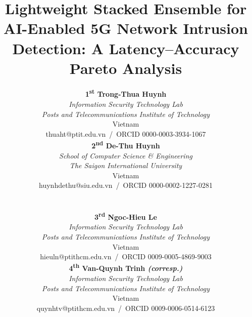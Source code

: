 \documentclass[conference]{IEEEtran}
\begin{document}
\title{Lightweight Stacked Ensemble for AI-Enabled 5G Network Intrusion Detection: A Latency--Accuracy Pareto Analysis
}

\author{%
\begin{minipage}[t]{0.48\textwidth}\centering
\textbf{1\textsuperscript{st} Trong-Thua Huynh}\\[0.25em]
\textit{Information Security Technology Lab}\\
\textit{Posts and Telecommunications Institute of Technology}\\
Vietnam\\
thuaht@ptit.edu.vn \,/\, ORCID 0000-0003-3934-1067
\end{minipage}%
\begin{minipage}[t]{0.48\textwidth}\centering
\textbf{2\textsuperscript{nd} De-Thu Huynh}\\[0.25em]
\textit{School of Computer Science \& Engineering}\\
\textit{The Saigon International University}\\
Vietnam\\
huynhdethu@siu.edu.vn \,/\, ORCID 0000-0002-1227-0281
\end{minipage}\\[1.2em]
\begin{minipage}[t]{0.48\textwidth}\centering
\textbf{3\textsuperscript{rd} Ngoc-Hieu Le}\\[0.25em]
\textit{Information Security Technology Lab}\\
\textit{Posts and Telecommunications Institute of Technology}\\
Vietnam\\
hieuln@ptithcm.edu.vn \,/\, ORCID 0009-0005-4869-9003
\end{minipage}%
\begin{minipage}[t]{0.48\textwidth}\centering
\textbf{4\textsuperscript{th} Van-Quynh Trinh \textit{(corresp.)}}\\[0.25em]
\textit{Information Security Technology Lab}\\
\textit{Posts and Telecommunications Institute of Technology}\\
Vietnam\\
quynhtv@ptithcm.edu.vn \,/\, ORCID 0009-0006-0514-6123
\end{minipage}%
}

\maketitle
\end{document}

